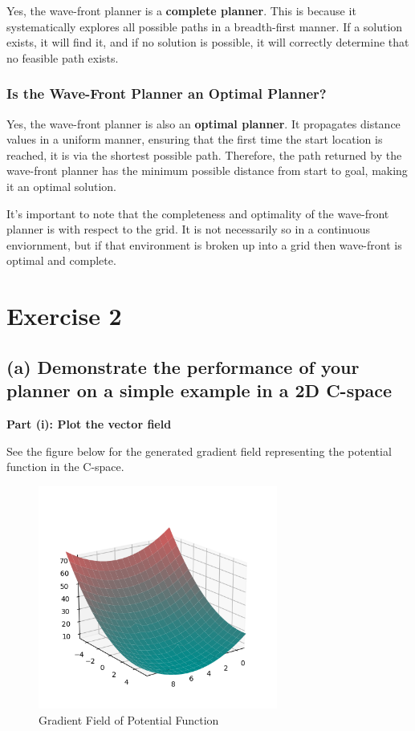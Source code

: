 \documentclass{article}
\begin{document}
Yes, the wave-front planner is a \textbf{complete planner}. This is because it systematically explores all possible paths in a breadth-first manner. If a solution exists, it will find it, and if no solution is possible, it will correctly determine that no feasible path exists.

\subsubsection*{Is the Wave-Front Planner an Optimal Planner?}

Yes, the wave-front planner is also an \textbf{optimal planner}. It propagates distance values in a uniform manner, ensuring that the first time the start location is reached, it is via the shortest possible path. Therefore, the path returned by the wave-front planner has the minimum possible distance from start to goal, making it an optimal solution.

It's important to note that the completeness and optimality of the wave-front planner is with respect to the grid. It is not necessarily so in a continuous enviornment, but if that environment is broken up into a grid then wave-front is optimal and complete.

\section{Exercise 2}

\subsection*{(a) Demonstrate the performance of your planner on a simple example in a 2D C-space}
\textbf{Part (i): Plot the vector field}

See the figure below for the generated gradient field representing the potential function in the C-space.

\begin{figure}[h!]
    \centering
    \includegraphics[width=0.7\textwidth]{partAgradient.png}
    \caption{Gradient Field of Potential Function}
    \label{fig:gradientFieldA}
\end{figure}
\end{document}
